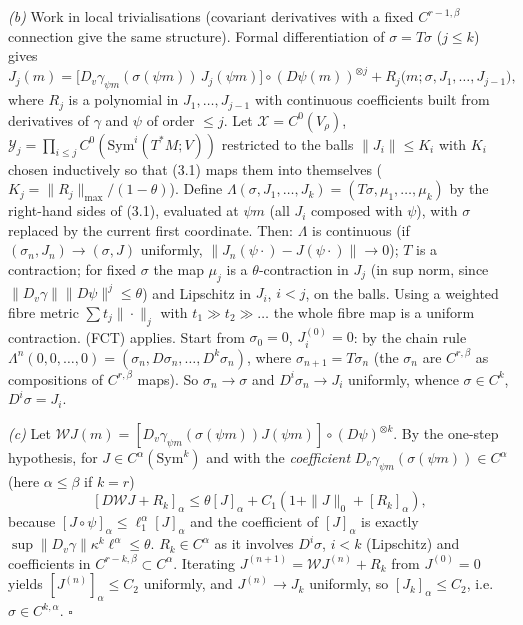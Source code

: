 \documentclass[11pt,a4paper]{article}
\theoremstyle{plain}
\theoremstyle{definition}
\theoremstyle{remark}
\numberwithin{equation}{section}
\numberwithin{figure}{section}
\begin{document}
\textit{(b)} Work in local trivialisations (covariant derivatives with a fixed $C^{r-1,\beta}$ connection give the same structure). Formal differentiation of $\sigma=T\sigma$ ($j\le k$) gives
\[
J_j(m)=\big[D_v\gamma_{\psi m}(\sigma(\psi m))\,J_j(\psi m)\big]\circ(D\psi(m))^{\otimes j}+R_j\big(m;\sigma,J_1,\dots,J_{j-1}\big),\tag{3.1}
\]
where $R_j$ is a polynomial in $J_1,\dots,J_{j-1}$ with continuous coefficients built from derivatives of $\gamma$ and $\psi$ of order $\le j$. Let $\mathcal X=C^0(V_\rho)$, $\mathcal Y_j=\prod_{i\le j}C^0(\mathrm{Sym}^i(T^*M;V))$ restricted to the balls $\|J_i\|\le K_i$ with $K_i$ chosen inductively so that (3.1) maps them into themselves ($K_j=\|R_j\|_{\max}/(1-\theta)$). Define $\Lambda(\sigma,J_1,\dots,J_k)=(T\sigma,\mu_1,\dots,\mu_k)$ by the right-hand sides of (3.1), evaluated at $\psi m$ (all $J_i$ composed with $\psi$), with $\sigma$ replaced by the current first coordinate. Then: $\Lambda$ is continuous (if $(\sigma_n,J_n)\to(\sigma,J)$ uniformly, $\|J_n(\psi\cdot)-J(\psi\cdot)\|\to0$); $T$ is a contraction; for fixed $\sigma$ the map $\mu_j$ is a $\theta$-contraction in $J_j$ (in sup norm, since $\|D_v\gamma\|\|D\psi\|^j\le\theta$) and Lipschitz in $J_i$, $i<j$, on the balls. Using a weighted fibre metric $\sum t_j\|\cdot\|_j$ with $t_1\gg t_2\gg\dots$ the whole fibre map is a uniform contraction. (FCT) applies. Start from $\sigma_0=0$, $J_i^{(0)}=0$: by the chain rule $\Lambda^n(0,0,\dots,0)=(\sigma_n,D\sigma_n,\dots,D^k\sigma_n)$, where $\sigma_{n+1}=T\sigma_n$ (the $\sigma_n$ are $C^{r,\beta}$ as compositions of $C^{r,\beta}$ maps). So $\sigma_n\to\sigma$ and $D^i\sigma_n\to J_i$ uniformly, whence $\sigma\in C^k$, $D^i\sigma=J_i$.

\textit{(c)} Let $\mathcal W J(m)=[D_v\gamma_{\psi m}(\sigma(\psi m))J(\psi m)]\circ(D\psi)^{\otimes k}$. By the one-step hypothesis, for $J\in C^\alpha(\mathrm{Sym}^k)$ and with the \textit{coefficient} $D_v\gamma_{\psi m}(\sigma(\psi m))\in C^{\alpha}$ (here $\alpha\le\beta$ if $k=r$)
\[
[D\mathcal WJ+R_k]_\alpha\le\theta[J]_\alpha+C_1(1+\|J\|_0+[R_k]_\alpha),
\]
because $[J\circ\psi]_\alpha\le\ell_1^\alpha[J]_\alpha$ and the coefficient of $[J]_\alpha$ is exactly $\sup\|D_v\gamma\|\kappa^k\ell^\alpha\le\theta$. $R_k\in C^\alpha$ as it involves $D^i\sigma$, $i<k$ (Lipschitz) and coefficients in $C^{r-k,\beta}\subset C^\alpha$. Iterating $J^{(n+1)}=\mathcal WJ^{(n)}+R_k$ from $J^{(0)}=0$ yields $[J^{(n)}]_\alpha\le C_2$ uniformly, and $J^{(n)}\to J_k$ uniformly, so $[J_k]_\alpha\le C_2$, i.e. $\sigma\in C^{k,\alpha}$. $\square$
\end{document}
